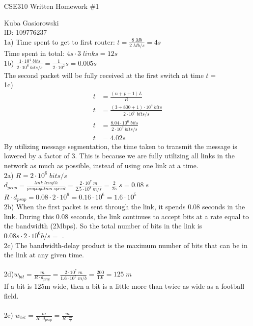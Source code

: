 \documentclass[12pt]{report}
\begin{document}
\Large
\centering
CSE310 Written Homework \#1

\justify
\normalsize

Kuba Gasiorowski\\
ID: 109776237\\

\noindent1a) Time spent to get to first router: $t = \frac{8\;Mb}{2\;Mb/s} =\boxed{4s}$\\	
Time spent in total: $4s \cdot 3\;links = \boxed{12s}$\\

\noindent1b) $\frac{1\cdot10^4\;bits}{2\cdot10^6\;bits/s} = \frac{1}{2\cdot10^2} s = \boxed{0.005s}$\\
The second packet will be fully received at the first switch at time $t=$\\

\noindent1c) 
\begin{align*}
t &= \frac{(n+p+1)L}{R}\\
t &= \frac{(3+800+1) \cdot 10^4\;bits}{2\cdot10^6\;bits/s}\\
t &= \frac{8.04\cdot10^6\;bits}{2 \cdot 10^6\;bits/s}\\
t &= \boxed{4.02s}
\end{align*}
By utilizing message segmentation, the time taken to transmit the message is lowered by a factor of 3. This is because we are fully utilizing all links in the network as much as possible, instead of using one link at a time.\\

\noindent2a) $R = 2 \cdot 10^6\;bits/s$\\
$d_{prop} = \frac{link\;length}{propagation\;speed} = \frac{2\cdot10^7\;m}{2.5 \cdot 10^8\; m/s} = \frac{2}{25}\;s = \boxed{0.08\;s}$\\

\noindent$R \cdot d_{prop} = 0.08 \cdot 2 \cdot 10^6 = 0.16 \cdot 10^6 = \boxed{1.6 \cdot 10^5}$\\

\noindent2b) When the first packet is sent through the link, it spends 0.08 seconds in the link. During this 0.08 seconds, the link continues to accept bits at a rate equal to the bandwidth (2Mbps). So the total number of bits in the link is $0.08s \cdot 2\cdot10^6b/s =$ .\\

\noindent2c) The bandwidth-delay product is the maximum number of bits that can be in the link at any given time.\\
\\
2d)$w_{bit} = \frac{m}{R \cdot d_{prop}} = \frac{2 \cdot 10^7\;m}{1.6\cdot10^5\;m/b} = \frac{200}{1.6} = \boxed{125\;m}$\\
If a bit is 125m wide, then a bit is a little more than twice as wide as a football field.\\
\\
2e) $w_{bit} = \frac{m}{R\cdot{}d_{prop}} = \boxed{\frac{m}{R \cdot \frac{m}{s}}}$\\
\end{document}
